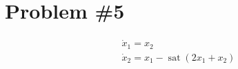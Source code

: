\section{Problem \#5}


$$
\begin{array}{l}
\dot{x}_{1}=x_{2} \\
\dot{x}_{2}=x_{1}-\operatorname{sat}\left(2 x_{1}+x_{2}\right)
\end{array}
$$
